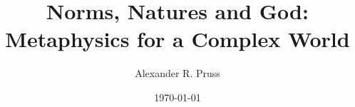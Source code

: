 \def\book{}



\title{Norms, Natures and God: Metaphysics for a Complex World}
\author{Alexander R. Pruss}
\date{\today}


\maketitle

\setcounter{secnumdepth}{4}
\setcounter{tocdepth}{4}
\tableofcontents














\printbibliography


